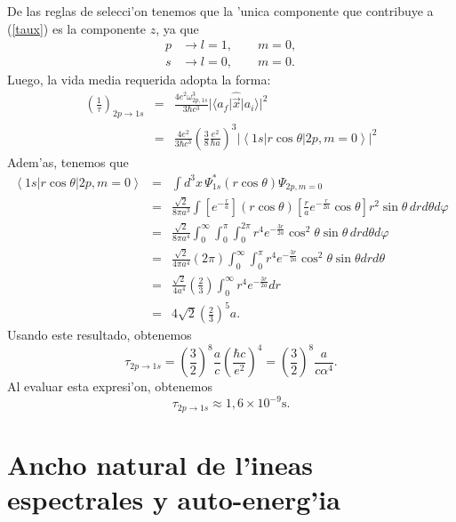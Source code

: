 De las reglas de selecci'on tenemos que la 'unica componente que contribuye a
(\ref{taux}) es la componente $z$, ya que%
\begin{eqnarray}
p & \rightarrow l=1,\qquad m=0,\\
s & \rightarrow l=0,\qquad m=0.
\end{eqnarray}
Luego, la vida media requerida adopta la forma:
\begin{eqnarray}
 \left(\frac{1}{\tau}\right)_{2p \rightarrow
1s}&=&\frac{4e^2\omega^3_{2p,1s}}{3\hbar c^3}|\langle
a_f|{\hat\vec{x}}|a_i\rangle |^2 \\
&=&\frac{4e^2}{3\hbar c^3}\left( \frac{3}{8}\frac{e^2}{\hbar a}\right)^3
|\left\langle 1s\right| r\cos\theta\left| 2p,m=0\right\rangle |^2 
\end{eqnarray}
Adem'as, tenemos que
\begin{eqnarray}
\left\langle
1s\right| r\cos\theta\left| 2p,m=0\right\rangle & = &\int
d^3x\,\Psi^{\ast}_{1s}\left( r\cos\theta\right)\Psi_{2p,m=0} \\
& = &\frac{\sqrt{2}}{8\pi a^3}\int\left[ e^{-\frac{r}{a}}\right] \left(
r\cos\theta\right) \left[ \frac
{r}{a}e^{-\frac{r}{2a}}\cos\theta\right] r^2\sin\theta\,dr d\theta
d\varphi\\
& = &\frac{\sqrt{2}}{8\pi a^{4}}\int_{0}^{\infty}\int_{0}^{\pi}\int_{0}^{2\pi
}r^{4}e^{-\frac{3r}{2a}}\cos^2\theta\sin\theta\, drd\theta d\varphi\\
& = &\frac{\sqrt{2}}{4\pi a^{4}}\left( 2\pi\right) \int_{0}^{\infty}\int
_{0}^{\pi}r^{4}e^{-\frac{3r}{2a}}\cos^2\theta\sin\theta drd\theta\\
& = &\frac{\sqrt{2}}{4a^{4}}\left( \frac{2}{3}\right) \int_{0}^{\infty}%
r^{4}e^{-\frac{3r}{2a}}dr\\
& = &4\sqrt{2}\left( \frac{2}{3}\right) ^{5}a .
\end{eqnarray} 
Usando este resultado, obtenemos
\begin{equation}
\tau_{2p \rightarrow 1s}=\left(\frac{3}{2}\right)^8\frac{a}{c}\left(\frac{\hbar
c}{e^2}\right)^4=\left(\frac{3}{2}\right)^8\frac{a}{c\alpha^4}.
\end{equation} 
Al evaluar esta expresi'on, obtenemos
\begin{equation}
 \tau_{2p \rightarrow 1s}\approx 1,6\times 10^{-9} \text{s}.
\end{equation} 


\section{Ancho natural de l'ineas espectrales y auto-energ'ia}

